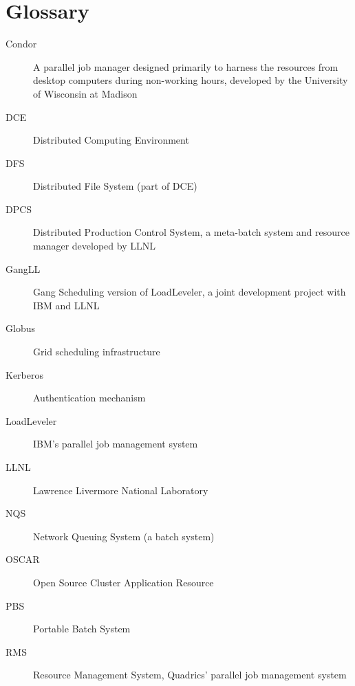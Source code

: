 \appendix
\newpage

\section{Glossary}

\begin{description}
\item[Condor]	A parallel job manager designed primarily to harness the 
		resources from desktop computers during non-working hours, 
		developed by the University of Wisconsin at Madison
\item[DCE]	Distributed Computing Environment
\item[DFS]	Distributed File System (part of DCE)
\item[DPCS]	Distributed Production Control System, a meta-batch system 
		and resource manager developed by LLNL
\item[GangLL]	Gang Scheduling version of LoadLeveler, a joint development 
		project with IBM and LLNL
\item[Globus]	Grid scheduling infrastructure
\item[Kerberos]	Authentication mechanism
\item[LoadLeveler] IBM's parallel job management system
\item[LLNL]	Lawrence Livermore National Laboratory
\item[NQS]	Network Queuing System (a batch system)
\item[OSCAR]	Open Source Cluster Application Resource
\item[PBS]	Portable Batch System
\item[RMS]	Resource Management System, Quadrics' parallel job management 
		system
\end{description}

\newpage


